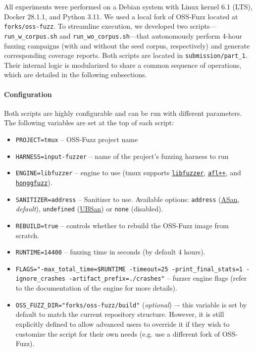 All experiments were performed on a Debian system with Linux kernel 6.1 (LTS), Docker 28.1.1, and Python 3.11. We used a local fork of OSS-Fuzz located at \texttt{forks/oss-fuzz}. To streamline execution, we developed two scripts---\texttt{run\_w\_corpus.sh} and \texttt{run\_wo\_corpus.sh}---that autonomously perform 4-hour fuzzing campaigns (with and without the seed corpus, respectively) and generate corresponding coverage reports. Both scripts are located in \texttt{submission/part\_1}. Their internal logic is modularized to share a common sequence of operations, which are detailed in the following subsections.

\noindent \paragraph{Configuration} \label{sec:methodology_configuration} Both scripts are highly configurable and can be run with different parameters. The following variables are set at the top of each script:
\begin{itemize}
	\item \texttt{PROJECT=tmux} -- OSS-Fuzz project name
	\item \texttt{HARNESS=input-fuzzer} -- name of the project's fuzzing harness to run
	\item \texttt{ENGINE=libfuzzer} -- engine to use (tmux supports
	      \href{https://llvm.org/docs/LibFuzzer.html}{\texttt{libfuzzer}},
	      \href{https://aflplus.plus/}{\texttt{afl++}}, and
	      \href{https://honggfuzz.dev/}{\texttt{honggfuzz}}).
	      \cite{oss-fuzz:tmux_project_yaml}
	\item \texttt{SANITIZER=address} -- Sanitizer to use. Available options:
	      \texttt{address} (\href{https://clang.llvm.org/docs/AddressSanitizer.html}{ASan}, \emph{default}),
	      \texttt{undefined} (\href{https://clang.llvm.org/docs/UndefinedBehaviorSanitizer.html}{UBSan}) or
	      \texttt{none} (disabled).
	      \cite{oss-fuzz:tmux_project_yaml}
	\item \texttt{REBUILD=true} -- controls whether to rebuild the OSS-Fuzz image from scratch.
	\item \texttt{RUNTIME=14400} -- fuzzing time in seconds (by default 4 hours).
	\item \texttt{FLAGS="-max\_total\_time=\$RUNTIME -timeout=25 -print\_final\_stats=1 -ignore\_crashes -artifact\_prefix=./crashes"} -- fuzzer engine flags (refer to the documentation of the engine for more details).
	\item \texttt{OSS\_FUZZ\_DIR="forks/oss-fuzz/build"} (\emph{optional}) –- this variable is set by default to match the current repository structure. However, it is still explicitly defined to allow advanced users to override it if they wish to customize the script for their own needs (e.g. use a different fork of OSS-Fuzz).
\end{itemize}

